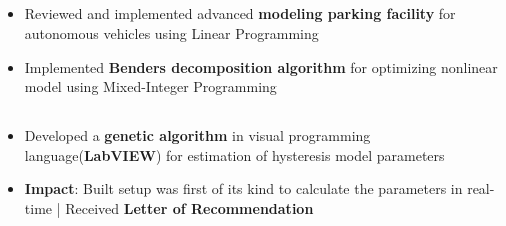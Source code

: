 \documentclass[a4paper,10pt]{article}
\newlength{\itemgap}
\newlength{\itembefore}
\newlength{\otherProjectsSubsectionGap}
\newcommand\scl{1.05}
\begin{document}
\vspace{\otherProjectsSubsectionGap}
\subsection{\scalebox{\scl}{Linear Programming Based Parking Facility} }
\begin{itemize}[topsep=\itembefore,itemsep=\itemgap,partopsep=0pt, parsep=0pt]
\item Reviewed and implemented advanced \textbf{modeling parking facility} for autonomous vehicles using Linear Programming
\item Implemented \textbf{Benders decomposition algorithm} for optimizing nonlinear model using Mixed-Integer Programming
\end{itemize}

\vspace{\otherProjectsSubsectionGap}
\subsection{\scalebox{\scl}{Genetic Algorithm-based Magnetic Characterization} }
\begin{itemize}[topsep=\itembefore,itemsep=\itemgap,partopsep=0pt, parsep=0pt]
\item Developed a \textbf{genetic algorithm} in visual programming language(\textbf{LabVIEW}) for estimation of hysteresis model parameters
\item \textbf{Impact}: Built setup was first of its kind to calculate the parameters in real-time | Received \textbf{Letter of Recommendation}
\end{itemize}


\end{document}

